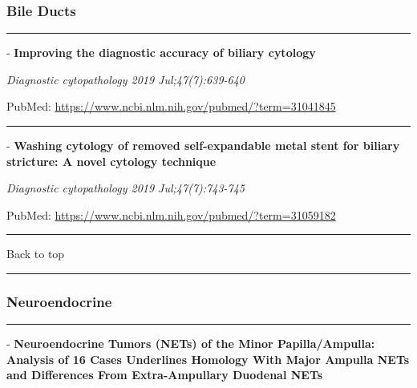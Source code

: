 \documentclass[]{article}
\begin{document}
\pagebreak

\hypertarget{bile-ducts-1}{%
\subsubsection{Bile Ducts}\label{bile-ducts-1}}

\begin{center}\rule{0.5\linewidth}{\linethickness}\end{center}

 - \textbf{Improving the diagnostic accuracy of biliary cytology}

\emph{Diagnostic cytopathology 2019 Jul;47(7):639-640}

PubMed: \url{https://www.ncbi.nlm.nih.gov/pubmed/?term=31041845}

{}

{}

\begin{center}\rule{0.5\linewidth}{\linethickness}\end{center}

 - \textbf{Washing cytology of removed self-expandable metal stent for
biliary stricture: A novel cytology technique}

\emph{Diagnostic cytopathology 2019 Jul;47(7):743-745}

PubMed: \url{https://www.ncbi.nlm.nih.gov/pubmed/?term=31059182}

{}

{}

\begin{center}\rule{0.5\linewidth}{\linethickness}\end{center}

Back to top

\begin{center}\rule{0.5\linewidth}{\linethickness}\end{center}

\pagebreak

\hypertarget{neuroendocrine-1}{%
\subsubsection{Neuroendocrine}\label{neuroendocrine-1}}

\begin{center}\rule{0.5\linewidth}{\linethickness}\end{center}

 - \textbf{Neuroendocrine Tumors (NETs) of the Minor Papilla/Ampulla:
Analysis of 16 Cases Underlines Homology With Major Ampulla NETs and
Differences From Extra-Ampullary Duodenal NETs}
\end{document}
